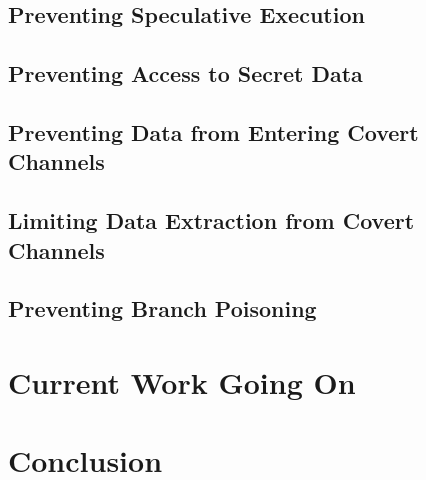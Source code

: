 \documentclass[12pt]{article}
\begin{document}
\subsection{Preventing Speculative Execution}
\subsection{Preventing Access to Secret Data}
\subsection{Preventing Data from Entering Covert Channels}
\subsection{Limiting Data Extraction from Covert Channels}
\subsection{Preventing Branch Poisoning}
\section{Current Work Going On}
\section{Conclusion}
\end{document}
